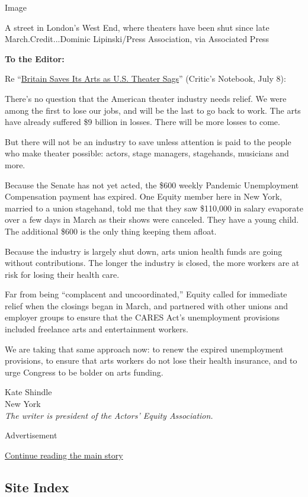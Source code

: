 Image

A street in London's West End, where theaters have been shut since late
March.Credit...Dominic Lipinski/Press Association, via Associated Press

\textbf{To the Editor:}

Re
``\href{https://www.nytimes.com/2020/07/07/theater/theater-bailout-britain.html?searchResultPosition=1}{Britain
Saves Its Arts as U.S. Theater Sags}'' (Critic's Notebook, July 8):

There's no question that the American theater industry needs relief. We
were among the first to lose our jobs, and will be the last to go back
to work. The arts have already suffered \$9 billion in losses. There
will be more losses to come.

But there will not be an industry to save unless attention is paid to
the people who make theater possible: actors, stage managers,
stagehands, musicians and more.

Because the Senate has not yet acted, the \$600 weekly Pandemic
Unemployment Compensation payment has expired. One Equity member here in
New York, married to a union stagehand, told me that they saw \$110,000
in salary evaporate over a few days in March as their shows were
canceled. They have a young child. The additional \$600 is the only
thing keeping them afloat.

Because the industry is largely shut down, arts union health funds are
going without contributions. The longer the industry is closed, the more
workers are at risk for losing their health care.

Far from being ``complacent and uncoordinated,'' Equity called for
immediate relief when the closings began in March, and partnered with
other unions and employer groups to ensure that the CARES Act's
unemployment provisions included freelance arts and entertainment
workers.

We are taking that same approach now: to renew the expired unemployment
provisions, to ensure that arts workers do not lose their health
insurance, and to urge Congress to be bolder on arts funding.

Kate Shindle\\
New York\\
\emph{The writer is president of the Actors' Equity Association.}

Advertisement

\protect\hyperlink{after-bottom}{Continue reading the main story}

\hypertarget{site-index}{%
\subsection{Site Index}\label{site-index}}

